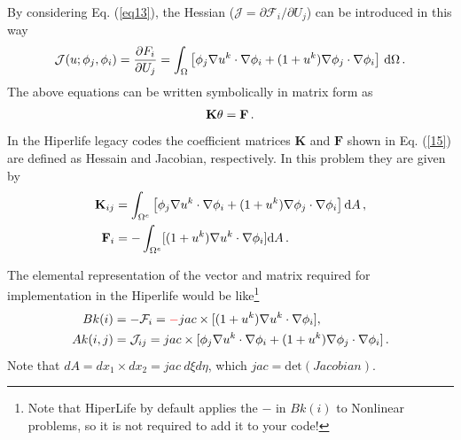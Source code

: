 \documentclass[]{article}
\begin{document}
By considering Eq. (\ref{eq13}), the Hessian ($\mathcal{J}=\partial \mathcal{F}_i/\partial U_j$) can be introduced in this way
\begin{equation}\label{eq13}
	\begin{aligned}
		\mathcal{J}(u;\phi_j,\phi_i) = {\partial F_i\over\partial U_j} = \int_\Omega \left\lbrack \phi_j \nabla u^k \cdot \nabla \phi_i + (1+u^k) \nabla \phi_j \cdot \nabla \phi_i \right\rbrack \, \mathrm{d}\Omega\thinspace .
	\end{aligned}
\end{equation}
The above equations can be written symbolically in matrix form as
\begin{equation}\label{eq13}
	\begin{aligned}
		\mathbf{K}\mathbf{\theta} = \mathbf{F}\thinspace.
	\end{aligned}
\end{equation}
In the Hiperlife legacy codes the coefficient matrices $\mathbf{K}$ and $\mathbf{F}$  shown in Eq. (\ref{15}) are defined as Hessain and Jacobian, respectively. In this problem they are given by
\begin{equation}\label{eq14}
	\begin{aligned}
		\mathbf{K}_{ij} &= \int_{\Omega^e} \left\lbrack \phi_j \nabla u^k \cdot \nabla \phi_i + (1+u^k) \nabla \phi_j \cdot \nabla \phi_i \right\rbrack\mathrm{d}A\thinspace,\\
		\mathbf{F}_i &=-\int_{\Omega^e} [(1+u^k)\nabla u^k\cdot \nabla \phi_i]\mathrm{d}A \thinspace.
	\end{aligned}
\end{equation}

The elemental representation of the vector and matrix required for implementation in the Hiperlife would be like\footnote{Note that HiperLife by default applies the $-$ in $Bk(i)$ to Nonlinear problems, so it is not required to add it to your code!}
\begin{equation}\label{eq14}
	\begin{aligned}[b]
		Bk(i) &= -\mathcal{F}_i = \mathcolor{red}{-}jac \times[(1+u^k)\nabla u^k\cdot \nabla \phi_i], \\
		Ak(i,j) &=  \mathcal{J}_{ij} = jac \times [\phi_j \nabla u^k \cdot \nabla \phi_i + (1+u^k) \nabla \phi_j \cdot \nabla \phi_i]\thinspace .
	\end{aligned}
\end{equation}
Note that $dA=dx_{1} \times dx_{2}=jac \ d\xi d\eta$, which $jac=\mathrm{det}(Jacobian)$.
\end{document}

